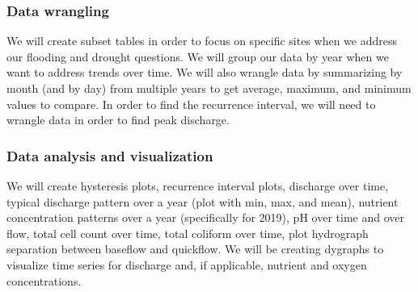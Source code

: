 \documentclass[]{article}
\begin{document}
\hypertarget{data-wrangling}{%
\subsubsection{Data wrangling}\label{data-wrangling}}

We will create subset tables in order to focus on specific sites when we
address our flooding and drought questions. We will group our data by
year when we want to address trends over time. We will also wrangle data
by summarizing by month (and by day) from multiple years to get average,
maximum, and minimum values to compare. In order to find the recurrence
interval, we will need to wrangle data in order to find peak discharge.

\hypertarget{data-analysis-and-visualization}{%
\subsubsection{Data analysis and
visualization}\label{data-analysis-and-visualization}}

We will create hysteresis plots, recurrence interval plots, discharge
over time, typical discharge pattern over a year (plot with min, max,
and mean), nutrient concentration patterns over a year (specifically for
2019), pH over time and over flow, total cell count over time, total
coliform over time, plot hydrograph separation between baseflow and
quickflow. We will be creating dygraphs to visualize time series for
discharge and, if applicable, nutrient and oxygen concentrations.
\end{document}
